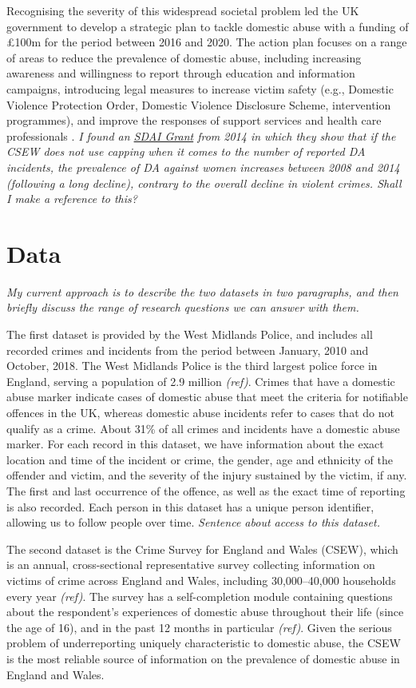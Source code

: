 \documentclass[12pt, letterpaper]{article}
\begin{document}
Recognising the severity of this widespread societal problem led the UK government to develop a strategic plan to tackle domestic abuse with a funding of £100m for the period between 2016 and 2020. The action plan focuses on a range of areas to reduce the prevalence of domestic abuse, including increasing awareness and willingness to report through education and information campaigns, introducing legal measures to increase victim safety (e.g., Domestic Violence Protection Order, Domestic Violence Disclosure Scheme, intervention programmes), and improve the responses of support services and health care professionals \cite{vawag}. \textit{I found an \href{https://www.researchcatalogue.esrc.ac.uk/grants/ES.K002899.1/read}{SDAI Grant}  from 2014 in which they show that if the CSEW does not use capping when it comes to the number of reported DA incidents, the prevalence of DA against women increases between 2008 and 2014 (following a long decline), contrary to the overall decline in violent crimes. Shall I make a reference to this?}

\section{Data}

\textit{My current approach is to describe the two datasets in two paragraphs, and then briefly discuss the range of research questions we can answer with them.}

The first dataset is provided by the West Midlands Police, and includes all recorded crimes and incidents from the period between January, 2010 and October, 2018. The West Midlands Police is the third largest police force in England, serving a population of 2.9 million \textit{(ref)}. Crimes that have a domestic abuse marker indicate cases of domestic abuse that meet the criteria for notifiable offences in the UK, whereas domestic abuse incidents refer to cases that do not qualify as a crime. About 31\% of all crimes and incidents have a domestic abuse marker. For each record in this dataset, we have information about the exact location and time of the incident or crime, the gender, age and ethnicity of the offender and victim, and the severity of the injury sustained by the victim, if any. The first and last occurrence of the offence, as well as the exact time of reporting is also recorded. Each person in this dataset has a unique person identifier, allowing us to follow people over time. \textit{Sentence about access to this dataset.}

The second dataset is the Crime Survey for England and Wales (CSEW), which is an annual, cross-sectional representative survey collecting information on victims of crime across England and Wales, including 30,000--40,000 households every year \textit{(ref)}. The survey has a self-completion module containing questions about the respondent's experiences of domestic abuse throughout their life (since the age of 16), and in the past 12 months in particular \textit{(ref)}. Given the serious problem of underreporting uniquely characteristic to domestic abuse, the CSEW is the most reliable source of information on the prevalence of domestic abuse in England and Wales.   
\end{document}
